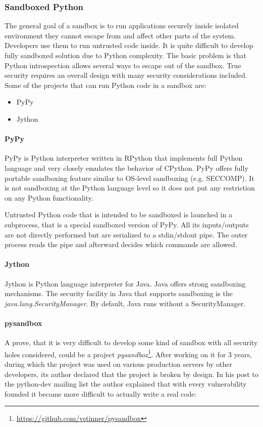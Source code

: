\subsubsection{Sandboxed Python}
The general goal of a sandbox is to run applications securely inside isolated environment they cannot escape from and
affect other parts of the system. Developers use them to run untrusted code inside. It is quite difficult to develop
fully sandboxed solution due to Python complexity. The basic problem is that Python introspection allows several ways
to escape out of the sandbox. True security requires an overall design with many security considerations included. Some
of the projects that can run Python code in a sandbox are:
\begin{itemize}
\item PyPy
\item Jython
\end{itemize}

\paragraph{PyPy} PyPy is Python interpreter written in RPython that implements full Python language and very closely 
emulates the behavior of CPython. PyPy offers fully portable sandboxing feature similar to OS-level sandboxing (e.g. SECCOMP).
It is not sandboxing at the Python language level so it does not put any restriction on any Python functionality.

Untrusted Python code that is intended to be sandboxed is launched in a subprocess, that is a special sandboxed version of PyPy.
All its inputs/outputs are not directly performed but are serialized to a stdin/stdout pipe. The outer process reads the pipe 
and afterward decides which commands are allowed.

\paragraph{Jython} Jython is Python language interpreter for Java. Java offers strong sandboxing mechanisms. The security 
facility in Java that supports sandboxing is the \textit{java.lang.SecurityManager}. By default, Java runs without a 
SecurityManager.

\paragraph{pysandbox} A prove, that it is very difficult to develop some kind of sandbox with all security holes 
considered, could be a project  \textit{pysandbox}\footnote{\url{https://github.com/vstinner/pysandbox}}. After working 
on it for 3 years, during which the project was used on various production servers by other developers, its author 
declared that the project is broken by
design. In his post to the python-dev mailing list \cite{PyDev_ML} the author explained that with every vulnerability 
founded it became more difficult to actually write a real code:

